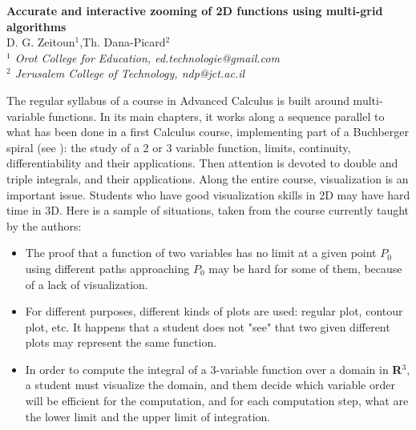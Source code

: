 \documentclass[11pt]{article}
\begin{document}
%
\vspace{-0.8cm}
\begin{flushleft}
\Large \textbf{\noindent
Accurate and interactive zooming of 2D functions using multi-grid algorithms}
\\
\vspace{0.5cm}
\normalsize
\normalsize{
  D. G. Zeitoun$^1$,Th. Dana-Picard$^2$
} \\
\vspace{5mm}
\textit{\footnotesize
$^1$ Orot College for Education, ed.technologie@gmail.com\\
$^2$ Jerusalem College of Technology, ndp@jct.ac.il
}
\end{flushleft}

The regular syllabus of a course in Advanced Calculus is built around multi-variable functions. In its main chapters, it works along a sequence parallel to what has been done in a first Calculus course, implementing part of a Buchberger spiral (see \cite{B}): the study of a 2 or 3 variable function, limits, continuity, differentiability and their applications. Then attention is devoted to double and triple integrals, and their applications. Along the entire course, visualization is an important issue. Students who have good visualization skills in 2D may have hard time in 3D.  Here is a sample of situations, taken from the course currently taught by the authors:

\begin{itemize}
\item The proof that a function of two variables has no limit at a given point $P_0$ using different paths approaching $P_0$ may be hard for some of them, because of a lack of visualization.
\item For different purposes, different kinds of plots are used: regular plot, contour plot, etc. It happens that a student does not "see" that two given different plots may represent the same function.
\item In order to compute the integral of a 3-variable function over a domain in \textbf{R}$^3$, a student must visualize the domain, and them decide which variable order will be efficient for the computation, and for each computation step, what are the lower limit and the upper limit of integration.
\end{itemize}
    
\end{document}
